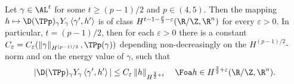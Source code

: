 \begin{lemma}\label{lem:RegularityTPRemainderII}
    Let $ \gamma\in \AL^{t} $ for some $ t\ge {(p-1)}/{2} $ and $ p\in(4,5) $. Then the mapping $ h\mapsto\D(\TPp)_{\gamma}Y_\gamma \left\langle \gamma',h' \right\rangle  $ is of class $ H^{t-1-\frac{p}{2}-\varepsilon}(\R/\Z,\R^n) $ for every $ \varepsilon>0$. 
    In particular, $ t={(p-1)}/{2} $, then for each $ \varepsilon>0 $ there is a constant $ C_{\varepsilon} =C_{\varepsilon}(\left\|\gamma \right\|_{H^{{(p-1)}/{2}}},\TPp(\gamma))$ depending non-decreasingly on the $ H^{{(p-1)}/{2}} $-norm and on the energy value of $ \gamma $, such that 
    \begin{equation}\label{eq:regremainderTPcondD}
    \begin{aligned}
        |\D(\TPp)_{\gamma}Y_\gamma \left\langle \gamma',h' \right\rangle  |\le C_{\varepsilon}\left\|h \right\|_{H^{\frac{3}{2}+\varepsilon}}\quad \Foa h\in H^{\frac{3}{2}+\varepsilon}(\R/\Z,\R^n).
    \end{aligned}
    \end{equation}
\end{lemma}
